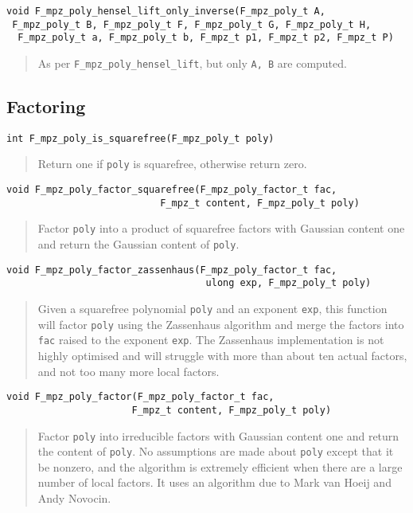 \documentclass[a4paper,10pt]{article}
\newcommand{\code}{\lstinline}
\begin{document}
\begin{lstlisting}
void F_mpz_poly_hensel_lift_only_inverse(F_mpz_poly_t A, 
 F_mpz_poly_t B, F_mpz_poly_t F, F_mpz_poly_t G, F_mpz_poly_t H, 
  F_mpz_poly_t a, F_mpz_poly_t b, F_mpz_t p1, F_mpz_t p2, F_mpz_t P)
\end{lstlisting}
\begin{quote}
As per \code{F_mpz_poly_hensel_lift}, but only \code{A, B} are computed.
\end{quote}

\subsection{Factoring}

\begin{lstlisting}
int F_mpz_poly_is_squarefree(F_mpz_poly_t poly)
\end{lstlisting}
\begin{quote}
Return one if \code{poly} is squarefree, otherwise return zero.
\end{quote}

\begin{lstlisting}
void F_mpz_poly_factor_squarefree(F_mpz_poly_factor_t fac, 
                           F_mpz_t content, F_mpz_poly_t poly)
\end{lstlisting}
\begin{quote}
Factor \code{poly} into a product of squarefree factors with Gaussian content one and return the Gaussian
content of \code{poly}.
\end{quote}

\begin{lstlisting}
void F_mpz_poly_factor_zassenhaus(F_mpz_poly_factor_t fac,
                                   ulong exp, F_mpz_poly_t poly)
\end{lstlisting}
\begin{quote}
Given a squarefree polynomial \code{poly} and an exponent \code{exp}, this function will factor \code{poly}
using the Zassenhaus algorithm and merge the factors into \code{fac} raised to the exponent \code{exp}. The 
Zassenhaus implementation is not highly optimised and will struggle with more than about ten actual factors, 
and not too many more local factors.
\end{quote}

\begin{lstlisting}
void F_mpz_poly_factor(F_mpz_poly_factor_t fac, 
		              F_mpz_t content, F_mpz_poly_t poly)
\end{lstlisting}
\begin{quote}
Factor \code{poly} into irreducible factors with Gaussian content one and return the content of \code{poly}.
No assumptions are made about \code{poly} except that it be nonzero, and the algorithm is extremely 
efficient when there are a large number of local factors. It uses an algorithm due to Mark van Hoeij and 
Andy Novocin.
\end{quote}
\end{document}
